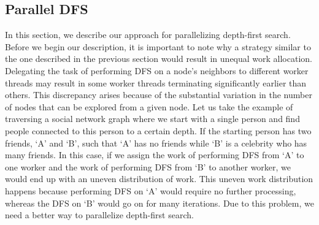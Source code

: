 \subsection{Parallel DFS}
In this section, we describe our approach for parallelizing depth-first search.
Before we begin our description, it is important to note why a strategy similar
to the one described in the previous section would result in unequal work
allocation. Delegating the task of performing DFS on a node's
neighbors to different worker threads may result in some worker
threads terminating significantly earlier than others. This discrepancy 
arises because of the substantial variation in the number of nodes that 
can be explored from a given node. Let us take the example of traversing a social
network graph where we start with a single person and find people connected to
this person to a certain depth. If the starting person has two friends, `A' and
`B', such that `A' has no friends while `B' is a celebrity who has many
friends. In this case, if we assign the work of performing DFS from `A' to one
worker and the work of performing DFS from `B' to another worker, we would end
up with an uneven distribution of work. This uneven work distribution happens because 
performing DFS on `A'
would require no further processing, whereas the DFS on `B' would go on for
many iterations. Due to this problem, we need a better way to parallelize
depth-first search.


